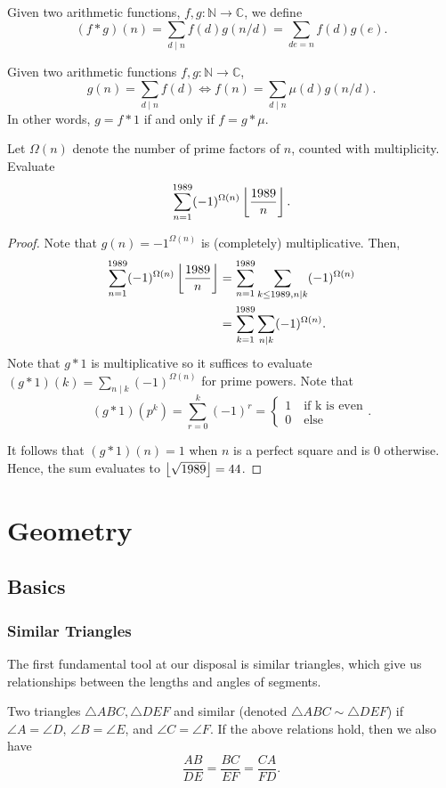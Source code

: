 \documentclass[11pt]{article}
\newcommand{\N}{\mathbb{N}}
\newcommand{\C}{\mathbb C}
\renewcommand{\>}{\rangle}
\newcommand{\<}{\langle}
\begin{document}
\begin{definition} Given two arithmetic functions, $f, g: \N \to \C$, we define 
$$(f * g)(n) = \sum_{d \mid n} f(d) g(n/d) = \sum_{de = n} f(d) g(e).$$
\end{definition}

\begin{theorem} Given two arithmetic functions $f, g: \N \to \C$, 
$$g(n) = \sum_{d \mid n} f(d) \Longleftrightarrow f(n) = \sum_{d  \mid n} \mu(d) g(n/d).$$
In other words, $g = f * 1$ if and only if $f = g * \mu$.
\end{theorem}

\begin{problem}[Bulgaria 1989] Let $\Omega(n)$ denote the number of prime factors of $n$, counted with multiplicity.  Evaluate 
$$\sum_{n=1}^{1989} (-1)^{\Omega(n)} \left\lfloor \frac{1989}{n} \right\rfloor.$$
\end{problem}
\begin{proof}
Note that $g(n) = -1^{\Omega(n)}$ is (completely) multiplicative.  Then,
\begin{align*}
\sum_{n=1}^{1989} (-1)^{\Omega(n)} \left\lfloor \frac{1989}{n} \right\rfloor &= \sum_{n=1}^{1989} \sum_{k \le 1989, n \mid k}  (-1)^{\Omega(n)} \\
&= \sum_{k=1}^{1989} \sum_{n \mid k} (-1)^{\Omega(n)}.
\end{align*}
Note that $g * 1$ is multiplicative so it suffices to evaluate $(g * 1)(k) = \sum_{n \mid k} (-1)^{\Omega(n)}$ for prime powers.  Note that 
$$(g*1)(p^k) = \sum_{r=0}^k (-1)^{r} = \begin{cases}
1 \quad \text{if k is even}\\
0 \quad \text{else}
\end{cases}.$$

It follows that $(g*1)(n) = 1$ when $n$ is a perfect square and is $0$ otherwise.  Hence, the sum evaluates to $\left\lfloor \sqrt{1989} \right\rfloor = 44$.
\end{proof} 
\pagebreak
\section{Geometry}
\subsection{Basics}
\subsubsection{Similar Triangles}
The first fundamental tool at our disposal is similar triangles, which give us relationships between the lengths and angles of segments.  \begin{definition} Two triangles $\triangle ABC, \triangle DEF$ and similar (denoted $\triangle ABC \sim \triangle DEF$) if $\angle A = \angle D$, $\angle B = \angle E$, and $\angle C = \angle F$.  If the above relations hold, then we also have
$$\frac{AB}{DE} = \frac{BC}{EF} = \frac{CA}{FD}.$$
\end{definition}
\end{document}
